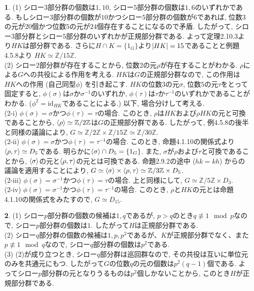 \documentclass{article}
\theoremstyle{definition}
\newtheorem{ans}{}
\numberwithin{ans}{subsection}
\DeclarePairedDelimiter{\gen}{\langle}{\rangle}
\DeclarePairedDelimiter{\order}{\lvert}{\rvert}
\begin{document}
\begin{ans}
  (1) シロー$3$部分群の個数は$1, 10$, シロー$5$部分群の個数は$1, 6$のいずれかである.
  もしシロー$3$部分群の個数が$10$かつシロー$5$部分群の個数が$6$であれば,
  位数$3$の元が$20$個かつ位数$5$の元が$24$個存在することになるので矛盾.
  したがって, シロー$3$部分群とシロー$5$部分群のいずれかが正規部分群である.
  よって定理2.10.3より$HK$は部分群である.
  さらに$H \cap K = \{1_G\}$より$\order{HK} = 15$であることと例題4.5.8より
  $HK \simeq \mathbb{Z}/15\mathbb{Z}$.\\
  (2) シロー$2$部分群が存在することから, 位数$2$の元$\rho$が存在することがわかる.
  $\rho$による$G$への共役による作用を考える.
  $HK$は$G$の正規部分群なので, この作用は$HK$への作用 (自己同型$\phi$) を引き起こす.
  $HK$の位数$3$の元$\sigma$, 位数$5$の元$\tau$をとって固定すると,
  $\phi(\sigma)$は$\sigma$か$\sigma^{-1}$のいずれか,
  $\phi(\tau)$は$\tau$か$\tau^{-1}$のいずれかであることがわかる. ($\phi^2 = \mathrm{id}_{HK}$であることによる.)
  以下, 場合分けして考える.\\
  (2-i) $\phi(\sigma) = \sigma$かつ$\phi(\tau) = \tau$の場合.
  このとき, $\rho$は$HK$および$\rho HK$の元と可換であることから, $\gen{\rho} \simeq \mathbb{Z}/2\mathbb{Z}$は$G$の正規部分群である.
  したがって, 例4.5.8の後半と同様の議論により, $G \simeq \mathbb{Z}/2\mathbb{Z} \times \mathbb{Z}/15\mathbb{Z} \simeq \mathbb{Z}/30\mathbb{Z}$.\\
  (2-ii) $\phi(\sigma) = \sigma$かつ$\phi(\tau) = \tau^{-1}$の場合.
  このとき, 命題4.1.10の関係式より$\gen{\rho, \tau} \simeq D_5$である.
  明らかに$\gen{\sigma} \cap D_5 = \{1_G\}$.
  また, $\sigma$が$\rho$および$\tau$と可換であることから,
  $\gen{\sigma}$の元と$\gen{\rho, \tau}$の元とは可換である.
  命題2.9.2の途中 ($hk = kh$) からの議論を適用することにより, $G \simeq \gen{\sigma} \times \gen{\rho, \tau} \simeq \mathbb{Z}/3\mathbb{Z} \times D_5$.\\
  (2-iii) $\phi(\sigma) = \sigma^{-1}$かつ$\phi(\tau) = \tau$の場合.
  上と同様にして, $G \simeq \mathbb{Z}/5\mathbb{Z} \times D_3$.\\
  (2-iv) $\phi(\sigma) = \sigma^{-1}$かつ$\phi(\tau) = \tau^{-1}$の場合.
  このとき, $\rho$と$HK$の元とは命題4.1.10の関係式をみたすので, $G \simeq D_{15}$.\\
\end{ans}

\begin{ans}
  (1) シロー$p$部分群の個数の候補は$1, q$であるが, $p > q$のとき$q \not\equiv 1 \mod p$なので, シロー$p$部分群の個数は$1$.
  したがって$H$は正規部分群である. \\
  (2) シロー$q$部分群の個数の候補は$1, p, p^2$であるが、$K$が正規部分群でなく、また$p \not\equiv 1 \mod q$なので,
  シロー$q$部分群の個数は$p^2$である. \\
  (3) (2)が成り立つとき, シロー$q$部分群は巡回群なので, その共役は互いに単位元のみを共通元にもつ.
  したがって$G$の位数$q$の元の個数は$p^2(q - 1)$個である. よってシロー$p$部分群の元となりうるものは$p^2$個しかないことから,
  このとき$H$が正規部分群である.
\end{ans}
\end{document}
